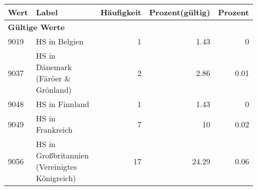      \begin{longtable}{lXrrr}
     \toprule
     \textbf{Wert} & \textbf{Label} & \textbf{Häufigkeit} & \textbf{Prozent(gültig)} & \textbf{Prozent} \\
     \endhead
     \midrule
     \multicolumn{5}{l}{\textbf{Gültige Werte}}\\

     9019 &
     \multicolumn{1}{X}{ HS in Belgien   } &


       \num{1} &
       \num[round-mode=places,round-precision=2]{1.43} &
         \num[round-mode=places,round-precision=2]{0} \\

     9037 &
     \multicolumn{1}{X}{ HS in Dänemark (Färöer \& Grönland)   } &


       \num{2} &
       \num[round-mode=places,round-precision=2]{2.86} &
         \num[round-mode=places,round-precision=2]{0.01} \\

     9048 &
     \multicolumn{1}{X}{ HS in Finnland   } &


       \num{1} &
       \num[round-mode=places,round-precision=2]{1.43} &
         \num[round-mode=places,round-precision=2]{0} \\

     9049 &
     \multicolumn{1}{X}{ HS in Frankreich   } &


       \num{7} &
       \num[round-mode=places,round-precision=2]{10} &
         \num[round-mode=places,round-precision=2]{0.02} \\

     9056 &
     \multicolumn{1}{X}{ HS in Großbritannien (Vereinigtes Königreich)   } &


       \num{17} &
       \num[round-mode=places,round-precision=2]{24.29} &
         \num[round-mode=places,round-precision=2]{0.06} \\


\end{longtable}
